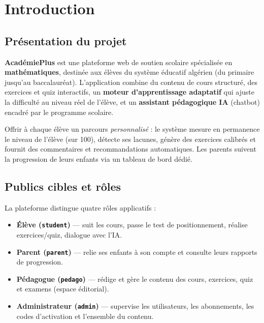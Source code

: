 \chapter{Introduction}

\section{Présentation du projet}
\textbf{AcadémiePlus} est une plateforme web de soutien scolaire spécialisée en
\textbf{mathématiques}, destinée aux élèves du système éducatif algérien
(du primaire jusqu'au baccalauréat). L'application combine du contenu de cours
structuré, des exercices et quiz interactifs, un \textbf{moteur d'apprentissage
adaptatif} qui ajuste la difficulté au niveau réel de l'élève, et un
\textbf{assistant pédagogique IA} (chatbot) encadré par le programme scolaire.

\begin{infobox}
Offrir à chaque élève un parcours \emph{personnalisé} : le système mesure en
permanence le niveau de l'élève (sur 100), détecte ses lacunes, génère des
exercices calibrés et fournit des commentaires et recommandations automatiques.
Les parents suivent la progression de leurs enfants via un tableau de bord dédié.
\end{infobox}

\section{Publics cibles et rôles}
La plateforme distingue quatre rôles applicatifs :
\begin{itemize}[leftmargin=1.4cm]
  \item[\faUserGraduate] \textbf{Élève (\texttt{student})} --- suit les cours, passe le test
        de positionnement, réalise exercices/quiz, dialogue avec l'IA.
  \item[\faUsers] \textbf{Parent (\texttt{parent})} --- relie ses enfants à son compte et
        consulte leurs rapports de progression.
  \item[\faChalkboardTeacher] \textbf{Pédagogue (\texttt{pedago})} --- rédige et gère le
        contenu des cours, exercices, quiz et examens (espace éditorial).
  \item[\faUserShield] \textbf{Administrateur (\texttt{admin})} --- supervise les
        utilisateurs, les abonnements, les codes d'activation et l'ensemble du contenu.
\end{itemize}

